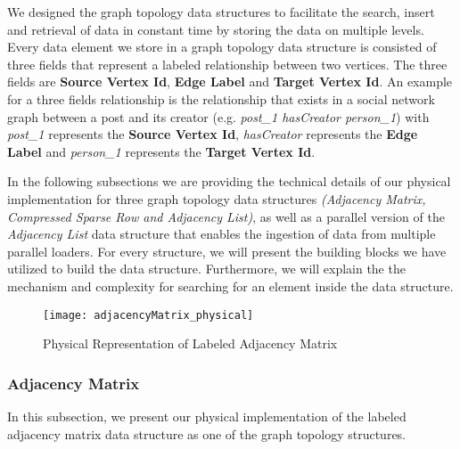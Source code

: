 {We designed the graph topology data structures to facilitate the search, insert and retrieval of data in constant time by storing the data on multiple levels. Every data element we store in a graph topology data structure is consisted of three fields that represent a labeled relationship between two vertices. The three fields are \textbf{Source Vertex Id}, \textbf{Edge Label} and \textbf{Target Vertex Id}. An example for a three fields relationship is the relationship that exists in a social network graph between a post and its creator (e.g. \textit{post\_1 hasCreator person\_1}) with \textit{post\_1} represents the \textbf{Source Vertex Id}, \textit{hasCreator} represents the \textbf{Edge Label} and \textit{person\_1} represents the \textbf{Target Vertex Id}.

In the following subsections we are providing the technical details of our physical implementation for three graph topology data structures \textit{(Adjacency Matrix, Compressed Sparse Row and Adjacency List)}, as well as a parallel version of the \textit{Adjacency List} data structure that enables the ingestion of data from multiple parallel loaders. For every structure, we will present the building blocks we have utilized to build the data structure. Furthermore, we will explain the the mechanism and complexity for searching for an element inside the data structure.





\begin{figure}
\centering
\texttt{[image: adjacencyMatrix\_physical]}
\caption{Physical Representation of Labeled Adjacency Matrix}
\label{fig_adjacencyMatrix_physical}
\end{figure} 

\subsubsection{Adjacency Matrix}

In this subsection, we present our physical implementation of the labeled adjacency matrix data structure as one of the graph topology structures.

\begin{itemize}


\end{itemize}}

